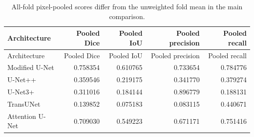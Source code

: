 \small
\begin{longtable}{lrrrr}
\caption{All-fold pixel-pooled scores differ from the unweighted fold mean in the main comparison.}\label{tab:pooled}\\
\toprule
Architecture & Pooled Dice & Pooled IoU & Pooled precision & Pooled recall\\\midrule
\endfirsthead
\toprule
Architecture & Pooled Dice & Pooled IoU & Pooled precision & Pooled recall\\\midrule
\endhead
Modified U-Net & 0.758354 & 0.610765 & 0.733654 & 0.784776\\
U-Net++ & 0.359546 & 0.219175 & 0.341770 & 0.379274\\
U-Net3+ & 0.311016 & 0.184144 & 0.896779 & 0.188131\\
TransUNet & 0.139852 & 0.075183 & 0.083115 & 0.440671\\
Attention U-Net & 0.709030 & 0.549223 & 0.671171 & 0.751416\\
\bottomrule\end{longtable}\normalsize
